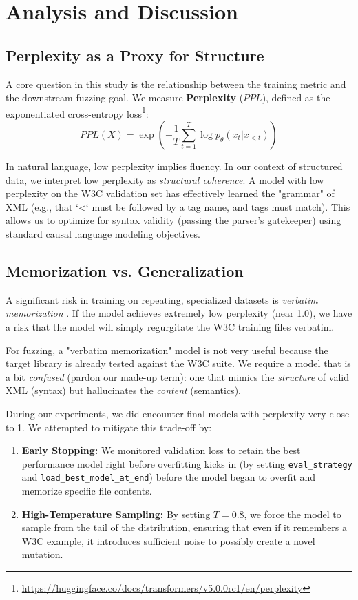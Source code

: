 \documentclass[11pt]{article}
\begin{document}
\section{Analysis and Discussion}

\subsection{Perplexity as a Proxy for Structure}
A core question in this study is the relationship between the training metric and the downstream fuzzing goal. We measure \textbf{Perplexity} ($PPL$), defined as the exponentiated cross-entropy loss\footnote{\url{https://huggingface.co/docs/transformers/v5.0.0rc1/en/perplexity}}:
\begin{equation}
    PPL(X) = \exp \left( -\frac{1}{T} \sum_{t=1}^{T} \log p_\theta(x_t | x_{<t}) \right)
\end{equation}

In natural language, low perplexity implies fluency. In our context of structured data, we interpret low perplexity as \textit{structural coherence}. A model with low perplexity on the W3C validation set has effectively learned the "grammar" of XML (e.g., that `<` must be followed by a tag name, and tags must match). This allows us to optimize for syntax validity (passing the parser's gatekeeper) using standard causal language modeling objectives.

\subsection{Memorization vs. Generalization}
A significant risk in training on repeating, specialized datasets is \textit{verbatim memorization} \cite{huang-etal-2024-demystifying}. If the model achieves extremely low perplexity (near 1.0), we have a risk that the model will simply regurgitate the W3C training files verbatim.

For fuzzing, a "verbatim memorization" model is not very useful because the target library is already tested against the W3C suite. We require a model that is a bit \textit{confused} (pardon our made-up term): one that mimics the \textit{structure} of valid XML (syntax) but hallucinates the \textit{content} (semantics). 

During our experiments, we did encounter final models with perplexity very close to 1. We attempted to mitigate this trade-off by:
\begin{enumerate}
    \item \textbf{Early Stopping:} We monitored validation loss to retain the best performance model right before overfitting kicks in (by setting \texttt{eval\_strategy} and \texttt{load\_best\_model\_at\_end}) before the model began to overfit and memorize specific file contents.
    \item \textbf{High-Temperature Sampling:} By setting $T=0.8$, we force the model to sample from the tail of the distribution, ensuring that even if it remembers a W3C example, it introduces sufficient noise to possibly create a novel mutation.
\end{enumerate}
\end{document}
